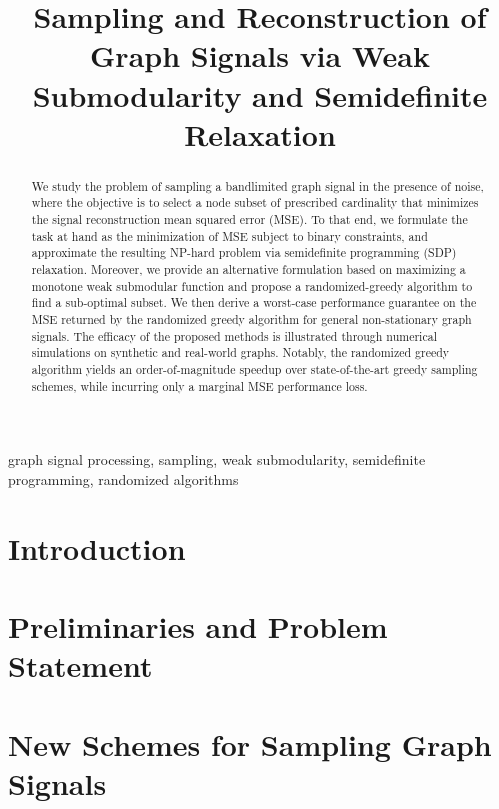 \documentclass{article}
\title{Sampling and Reconstruction of Graph Signals via  Weak Submodularity and Semidefinite Relaxation}
\begin{document}
%
\maketitle
%
\begin{abstract}
We study the problem of sampling a bandlimited graph signal in the presence of noise, where the objective is to 
select a node subset of prescribed cardinality that minimizes the signal reconstruction mean squared error (MSE). 
To that end, we formulate the task at hand as the minimization of MSE subject to binary constraints, and 
approximate the resulting NP-hard problem via semidefinite programming (SDP) relaxation. Moreover, we provide 
an alternative  formulation based on maximizing a monotone weak submodular function and propose a randomized-greedy 
algorithm to find a sub-optimal subset. We then derive a worst-case performance guarantee on the MSE returned 
by the randomized greedy algorithm for general non-stationary graph signals. The efficacy of the proposed 
methods is illustrated through numerical simulations on synthetic and real-world graphs. Notably, the randomized greedy 
algorithm yields an order-of-magnitude speedup over state-of-the-art greedy sampling schemes, while incurring 
only a marginal MSE performance loss.
\end{abstract}
%
\begin{keywords}
graph signal processing, sampling, weak submodularity, semidefinite programming, randomized algorithms \vspace{-0.2cm}
\end{keywords}
\section{Introduction}\label{sec:intro}

\vspace{-0.25cm}
\section{Preliminaries and Problem Statement}\label{sec:pre}

\vspace{-0.2cm}
\section{New Schemes for Sampling Graph Signals}\label{sec:alg}

\vspace{-0.55cm}
\end{document}

